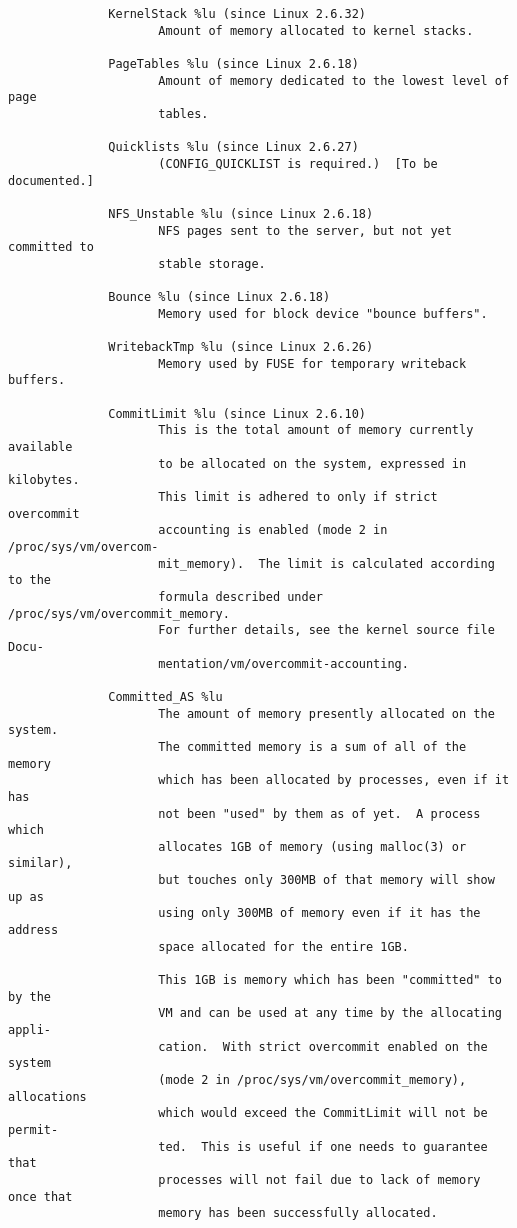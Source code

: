 \documentclass[]{article}
\begin{document}
\begin{verbatim}
              KernelStack %lu (since Linux 2.6.32)
                     Amount of memory allocated to kernel stacks.

              PageTables %lu (since Linux 2.6.18)
                     Amount of memory dedicated to the lowest level of page
                     tables.

              Quicklists %lu (since Linux 2.6.27)
                     (CONFIG_QUICKLIST is required.)  [To be documented.]

              NFS_Unstable %lu (since Linux 2.6.18)
                     NFS pages sent to the server, but not yet committed to
                     stable storage.

              Bounce %lu (since Linux 2.6.18)
                     Memory used for block device "bounce buffers".

              WritebackTmp %lu (since Linux 2.6.26)
                     Memory used by FUSE for temporary writeback buffers.

              CommitLimit %lu (since Linux 2.6.10)
                     This is the total amount of memory currently available
                     to be allocated on the system, expressed in kilobytes.
                     This limit is adhered to only if strict overcommit
                     accounting is enabled (mode 2 in /proc/sys/vm/overcom‐
                     mit_memory).  The limit is calculated according to the
                     formula described under /proc/sys/vm/overcommit_memory.
                     For further details, see the kernel source file Docu‐
                     mentation/vm/overcommit-accounting.

              Committed_AS %lu
                     The amount of memory presently allocated on the system.
                     The committed memory is a sum of all of the memory
                     which has been allocated by processes, even if it has
                     not been "used" by them as of yet.  A process which
                     allocates 1GB of memory (using malloc(3) or similar),
                     but touches only 300MB of that memory will show up as
                     using only 300MB of memory even if it has the address
                     space allocated for the entire 1GB.

                     This 1GB is memory which has been "committed" to by the
                     VM and can be used at any time by the allocating appli‐
                     cation.  With strict overcommit enabled on the system
                     (mode 2 in /proc/sys/vm/overcommit_memory), allocations
                     which would exceed the CommitLimit will not be permit‐
                     ted.  This is useful if one needs to guarantee that
                     processes will not fail due to lack of memory once that
                     memory has been successfully allocated.


\end{verbatim}
\end{document}
